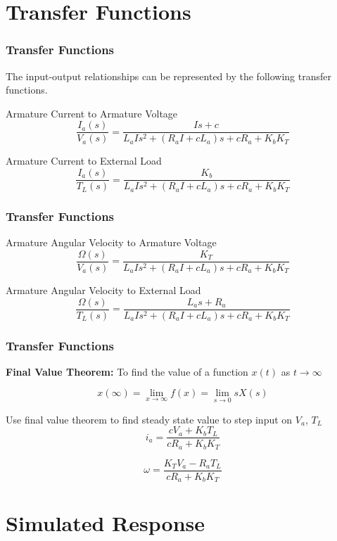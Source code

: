 \documentclass[fleqn]{beamer}                  %
\newcommand{\sectiontitleIV}{Transfer Functions}
\newcommand{\sectiontitleV}{Simulated Response}
\begin{document}
\section{\sectiontitleIV}

	\begin{frame}[label=sectionIV] \small
		\frametitle{\sectiontitleIV}
		The input-output relationships can be represented by the following transfer functions.\vspc

		Armature Current to Armature Voltage
		\[\frac{I_a\left(s\right)}{V_a\left(s\right)}=\frac{Is+c}{L_aIs^2+\left(R_aI+cL_a\right)s+cR_a+K_bK_T}\]
		
		Armature Current to External Load
		\[\frac{I_a\left(s\right)}{T_L\left(s\right)}=\frac{K_b}{L_aIs^2+\left(R_aI+cL_a\right)s+cR_a+K_bK_T}\]

	\end{frame}	

	\begin{frame}[label=sectionIV] \small
		\frametitle{\sectiontitleIV}

		Armature Angular Velocity to Armature Voltage
		\[\frac{\Omega\left(s\right)}{V_a\left(s\right)}=\frac{K_T}{L_aIs^2+\left(R_aI+cL_a\right)s+cR_a+K_bK_T}\]
		
		Armature Angular Velocity to External Load
		\[\frac{\Omega\left(s\right)}{T_L\left(s\right)}=\frac{L_as+R_a}{L_aIs^2+\left(R_aI+cL_a\right)s+cR_a+K_bK_T}\]
		
	\end{frame}	

	\begin{frame}[label=sectionIV] \small
		\frametitle{\sectiontitleIV}

		\textbf{Final Value Theorem:} 
		To find the value of a function $x(t)$ as $t\rightarrow \infty$  

		\[x\left(\infty\right)=\lim_{x\to\infty} f(x) = \lim_{s\to 0} sX\left(s\right)\]

		Use final value theorem to find steady state value to step input on $V_a$, $T_L$
		\[i_a=\frac{cV_a + K_bT_L}{cR_a+K_bK_T}\]

		\[\omega=\frac{K_TV_a-R_aT_L}{cR_a+K_bK_T}\]

	\end{frame}

\section{\sectiontitleV}
\end{document}

